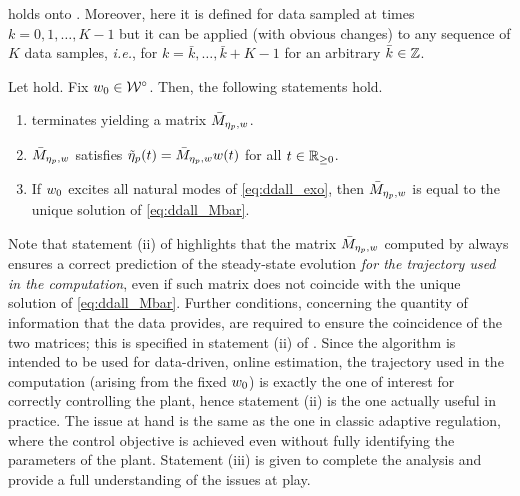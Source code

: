\begin{remark}
   holds onto . Moreover, here it is defined for data sampled at times $k=0,1,\dotsc,K-1$ but it can be applied (with obvious changes) to any sequence of $K$ data samples, \emph{i.e.}, for $k=\bar{k},\dotsc,\bar{k}+K-1$ for an arbitrary $\bar{k}\in\mathbb{Z}$.\closeremark
\end{remark}

\begin{proposition}
  \label{prop:ddall_est_mom}
	Let  hold. Fix $w_0\in\mathcal{W}^\circ$. Then, the following statements hold.
	\begin{enumerate}
		\item[i.]  terminates yielding a matrix $\bar{M}_{\eta_p,w}$.
		\item[ii.] $\bar{M}_{\eta_p,w}$ satisfies $\tilde{\eta}_p(t)=\bar{M}_{\eta_p,w}w(t)$ for all $t\in\mathbb{R}_{\geq 0}$.
		\item[iii.] If $w_0$ excites all natural modes of \eqref{eq:ddall_exo},	then $\bar{M}_{\eta_p,w}$ is equal to the unique solution of \eqref{eq:ddall_Mbar}.\closestatement
	\end{enumerate}
\end{proposition}
Note that statement (ii) of  highlights that the matrix $\bar{M}_{\eta_p,w}$ computed by  always ensures a correct prediction of the steady-state evolution \emph{for the trajectory used in the computation}, even if such matrix does not coincide with the unique solution of \eqref{eq:ddall_Mbar}. Further conditions, concerning the quantity of information that the data provides, are required to ensure the coincidence of the two matrices; this is specified in statement (ii) of . Since the algorithm is intended to be used for data-driven, online estimation, the trajectory used in the computation (arising from the fixed $w_0$) is exactly the one of interest for correctly controlling the plant, hence statement (ii) is the one actually useful in practice. The issue at hand is the same as the one in classic adaptive regulation, where the control objective is achieved even without fully identifying the parameters of the plant. Statement (iii) is given to complete the analysis and provide a full understanding of the issues at play.
